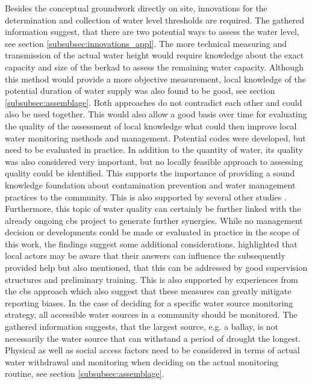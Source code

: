 Besides the conceptual groundwork directly on site, innovations for the determination and collection of water level thresholds are required. The gathered information suggest, that there are two potential ways to assess the water level, see section \ref{subsubsec:innovations_appl}. The more technical measuring and transmission of the actual water height would require knowledge about the exact capacity and size of the berkad to assess the remaining water capacity. Although this method would provide a more objective measurement, local knowledge of the potential duration of water supply was also found to be good, see section \ref{subsubsec:assemblage}. Both approaches do not contradict each other and could also be used together. This would also allow a good basis over time for evaluating the quality of the assessment of local knowledge what could then improve local water monitoring methods and management. Potential codes were developed, but need to be evaluated in practice. In addition to the quantity of water, its quality was also considered very important, but no locally feasible approach to assessing quality could be identified. This supports the importance of providing a sound knowledge foundation about contamination prevention and water management practices to the community. This is also supported by several other studies \autocite{danielAssessingDrinkingWater2020,huangManagementDrinkingWater2020,tariqOpenSourceWater2021,wmoPlanningWaterqualityMonitoring2013}. Furthermore, this topic of water quality can certainly be further linked with the already ongoing \acrshort{cbs} project to generate further synergies.
While no management decision or developments could be made or evaluated in practice in the scope of this work, the findings suggest some additional considerations. \Textcite{gualazziniEWEAEarlyWarning2021} highlighted that local actors may be aware that their answers can influence the subsequently provided help but also mentioned, that this can be addressed by good supervision structures and preliminary training. This is also supported by experiences from the \acrshort{cbs} approach which also suggest that these measures can greatly mitigate reporting biases.\newline
In the case of deciding for a specific water source monitoring strategy, all accessible water sources in a community should be monitored. The gathered information suggests, that the largest source, e.g. a ballay, is not necessarily the water source that can withstand a period of drought the longest. Physical as well as social access factors need to be considered in terms of actual water withdrawal and monitoring when deciding on the actual monitoring routine, see section \ref{subsubsec:assemblage}.\newline
